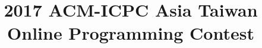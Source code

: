 \documentclass[11pt]{article}
\begin{document}
\title{2017 ACM-ICPC Asia Taiwan Online Programming Contest}
\author{}

\newpage
{}
\setcounter{page}{1}

\newpage

\newpage

\newpage

\newpage

\newpage

\newpage

\newpage

\newpage


\newpage
{}
\setcounter{page}{1}

\newpage

\newpage

\newpage

\newpage

\newpage

\newpage

\newpage

\end{document}
